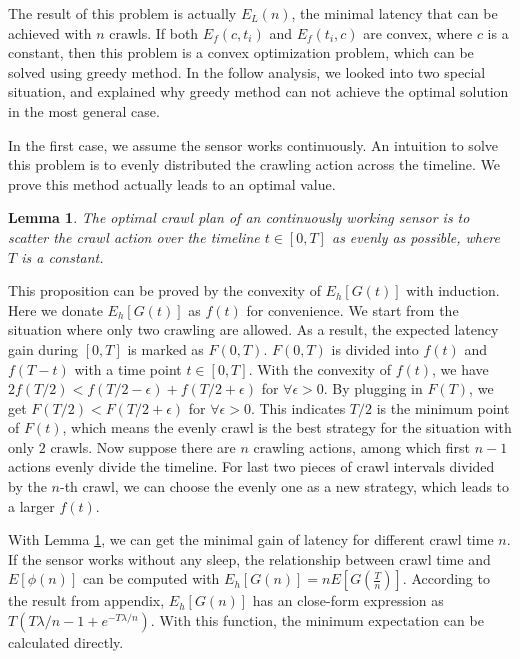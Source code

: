 \documentclass[conference]{IEEEtran}
\newtheorem{lemma}{Lemma}
\begin{document}
The result of this problem is actually $E_L(n)$, the minimal latency that can be achieved with $n$ crawls.
If both $E_f(c, t_i)$ and $E_f(t_i,c)$ are convex, where $c$ is a constant, then this problem is a convex optimization problem, which can be solved using greedy method.
In the follow analysis, we looked into two special situation, and explained why greedy method can not achieve the optimal solution in the most general case.

In the first case, we assume the sensor works continuously.
An intuition to solve this problem is to evenly distributed the crawling action across the timeline. 
We prove this method actually leads to an optimal value.
\begin{lemma}
\label{evenly}
The optimal crawl plan of an continuously working sensor is to scatter the crawl action over the timeline $t\in [0, T]$ as evenly as possible, where $T$ is a constant.
\end{lemma}
\begin{IEEEproof}
This proposition can be proved by the convexity of $E_h[G(t)]$ \cite{boyd2004convex} with induction. 
Here we donate $E_h[G(t)]$ as $f(t)$ for convenience.
We start from the situation where only two crawling are allowed. 
As a result, the expected latency gain during $[0,T]$ is marked as $F(0, T)$.
$F(0,T)$ is divided into $f(t)$ and $f(T-t)$ with a time point $t\in[0,T]$. 
With the convexity of $f(t)$, we have $2f(T/2)<f(T/2-\epsilon)+f(T/2+\epsilon)$ for $\forall{\epsilon>0}$. 
By plugging in $F(T)$, we get $F(T/2)<F(T/2+\epsilon)$ for $\forall{\epsilon>0}$.
This indicates $T/2$ is the minimum point of $F(t)$, which means the evenly crawl is the best strategy for the situation with only $2$ crawls.
Now suppose there are $n$ crawling actions, among which first $n-1$ actions evenly divide the timeline.
For last two pieces of crawl intervals divided by the $n$-th crawl, we can choose the evenly one as a new strategy, which leads to a larger $f(t)$.
\end{IEEEproof}

With Lemma \ref{evenly}, we can get the minimal gain of latency for different crawl time $n$.
If the sensor works without any sleep, the relationship between crawl time and $E[\phi(n)]$ can be computed with $E_h[G(n)]=nE[G(\frac{T}{n})]$.
According to the result from appendix, $E_h[G(n)]$ has an close-form expression as $T(T\lambda/n-1+e^{-T\lambda/n})$. 
With this function, the minimum expectation can be calculated directly.
\end{document}
